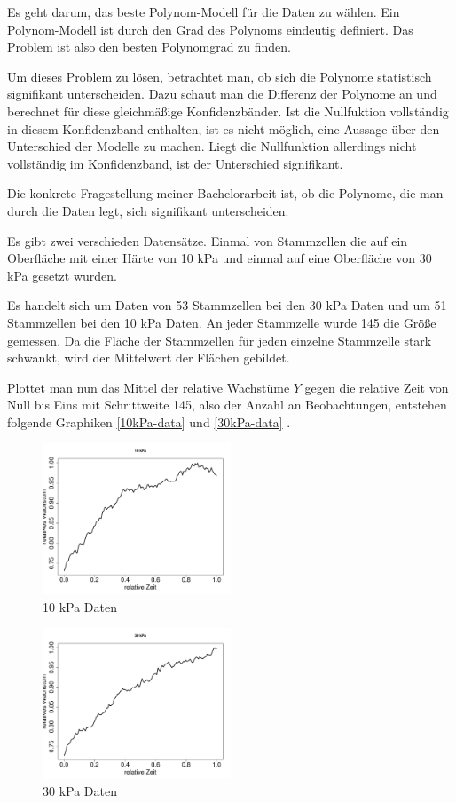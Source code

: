 \documentclass[12pt,a4paper]{article}
\theoremstyle{definition}
\theoremstyle{definition}
\theoremstyle{definition}
\theoremstyle{definition}
\begin{document}
Es geht darum, das beste Polynom-Modell für die Daten zu wählen. Ein Polynom-Modell ist durch den Grad des Polynoms eindeutig definiert. Das Problem ist also den besten Polynomgrad zu finden.

Um dieses Problem zu lösen, betrachtet man, ob sich die Polynome statistisch signifikant unterscheiden. Dazu schaut man die Differenz der Polynome an und berechnet für diese gleichmäßige Konfidenzbänder. Ist die Nullfuktion vollständig in diesem Konfidenzband enthalten, ist es nicht möglich, eine Aussage über den Unterschied der Modelle zu machen. Liegt die Nullfunktion allerdings nicht vollständig im Konfidenzband, ist der Unterschied signifikant.

Die konkrete Fragestellung meiner Bachelorarbeit ist, ob die Polynome, die man durch die Daten legt, sich signifikant unterscheiden.

Es gibt zwei verschieden Datensätze. Einmal von Stammzellen die auf ein Oberfläche mit einer Härte von 10 kPa und einmal auf eine Oberfläche von 30 kPa gesetzt wurden. 

Es handelt sich um Daten von 53 Stammzellen bei den 30 kPa Daten und um 51 Stammzellen bei den 10 kPa Daten. An jeder Stammzelle wurde 145 die Größe gemessen. Da die Fläche der Stammzellen für jeden einzelne Stammzelle stark schwankt, wird der Mittelwert der Flächen gebildet.

Plottet man nun das Mittel der relative Wachstüme $Y$ gegen die relative Zeit von Null bis Eins mit Schrittweite 145, also der Anzahl an Beobachtungen, entstehen folgende Graphiken \eqref{10kPa-data} und \eqref{30kPa-data} . 

\begin{figure}[H] 
  \centering
     \includegraphics[width=0.5\textwidth]{10kPa-data.pdf}
  \caption{10 kPa Daten}
  \label{10kPa-data}
\end{figure}

\begin{figure}[H] 
  \centering
     \includegraphics[width=0.5\textwidth]{30kPa-data.pdf}
  \caption{30 kPa Daten}
  \label{30kPa-data}
\end{figure}
\end{document}
